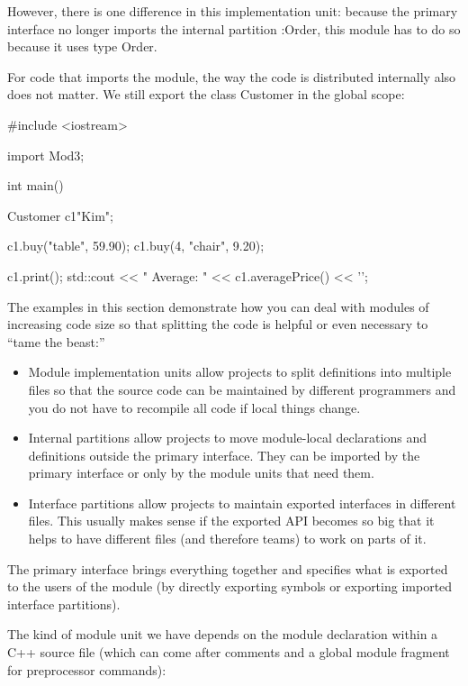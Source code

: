 However, there is one difference in this implementation unit: because the primary interface no longer imports the internal partition :Order, this module has to do so because it uses type Order.

For code that imports the module, the way the code is distributed internally also does not matter. We still export the class Customer in the global scope:


\begin{cpp}
#include <iostream>

import Mod3;

int main()
{
	Customer c1{"Kim"};
	
	c1.buy("table", 59.90);
	c1.buy(4, "chair", 9.20);
	
	c1.print();
	std::cout << " Average: " << c1.averagePrice() << '\n';
}
\end{cpp}



The examples in this section demonstrate how you can deal with modules of increasing code size so that splitting the code is helpful or even necessary to “tame the beast:”

\begin{itemize}
\item 
Module implementation units allow projects to split definitions into multiple files so that the source code can be maintained by different programmers and you do not have to recompile all code if local things change.

\item 
Internal partitions allow projects to move module-local declarations and definitions outside the primary interface. They can be imported by the primary interface or only by the module units that need them.

\item 
Interface partitions allow projects to maintain exported interfaces in different files. This usually makes sense if the exported API becomes so big that it helps to have different files (and therefore teams) to work on parts of it.
\end{itemize}

The primary interface brings everything together and specifies what is exported to the users of the module (by directly exporting symbols or exporting imported interface partitions).

The kind of module unit we have depends on the module declaration within a C++ source file (which can come after comments and a global module fragment for preprocessor commands):


